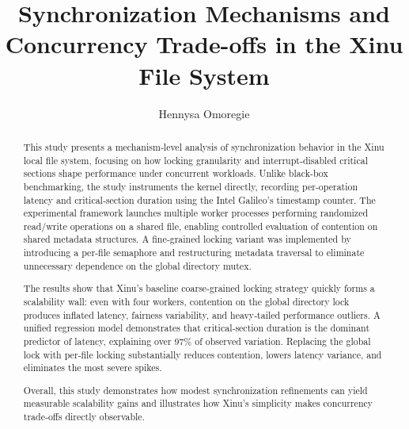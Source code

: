 \documentclass[sigconf]{acmart}
\begin{document}
\title{Synchronization Mechanisms and Concurrency Trade-offs in the Xinu File System}

  
\author{Hennysa Omoregie}
\authornotemark[1]

\renewcommand{\shortauthors}{Hennysa Omoregie*}






\begin{abstract}

This study presents a mechanism‑level analysis of synchronization behavior in the Xinu local file system, focusing on how locking granularity and interrupt‑disabled critical sections shape performance under concurrent workloads. Unlike black-box benchmarking, the study instruments the kernel directly, recording per‑operation latency and critical‑section duration using the Intel Galileo’s timestamp counter. The experimental framework launches multiple worker processes performing randomized read/write operations on a shared file, enabling controlled evaluation of contention on shared metadata structures. A fine‑grained locking variant was implemented by introducing a per‑file semaphore and restructuring metadata traversal to eliminate unnecessary dependence on the global directory mutex.

The results show that Xinu’s baseline coarse‑grained locking strategy quickly forms a scalability wall: even with four workers, contention on the global directory lock produces inflated latency, fairness variability, and heavy‑tailed performance outliers. A unified regression model demonstrates that critical‑section duration is the dominant predictor of latency, explaining over 97\% of observed variation. Replacing the global lock with per‑file locking substantially reduces contention, lowers latency variance, and eliminates the most severe spikes. 

Overall, this study demonstrates how modest synchronization refinements can yield measurable scalability gains and illustrates how Xinu’s simplicity makes concurrency trade‑offs directly observable.

\end{abstract}
\end{document}
